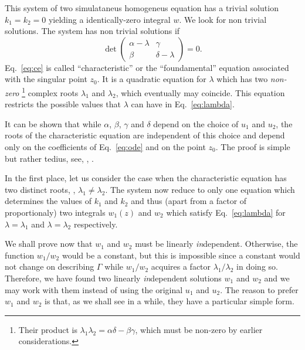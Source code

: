 This system of two simulataneus homogeneus equation has a trivial solution
$k_{1}= k_{2} = 0$ yielding a identically-zero integral $w$.
We look for non trivial solutions.
The system has non trivial solutions if 
\begin{dmath}[label={ce}]
   \det \begin{pmatrix} \alpha - \lambda & \gamma \\ \beta & \delta - \lambda
   \end{pmatrix} = 0 .
\end{dmath}
Eq.~\eqref{eq:ce} is called ``characteristic'' or the ``foundamental''
equation associated with the singular point $z_{0}$.
It is a quadratic equation for $\lambda$ which has two \emph{non-zero}%
\footnote{Their product is $\lambda_{1} \lambda_{2} = \alpha \delta - \beta
   \gamma$, which must be non-zero by earlier considerations.}
complex roots
$\lambda_{1}$ and $\lambda_{2}$, which eventually may coincide.
This equation restricts the possible values that $\lambda$ can have in
Eq.~\eqref{eq:lambda}.

It can be shown that while $\alpha$, $\beta$, $\gamma$ and $\delta$ depend on
the choice of $u_{1}$ and $u_{2}$, the roots of the characteristic equation are
independent of this choice and depend only on the coefficients of
Eq.~\eqref{eq:ode} and on the point $z_{0}$.  The proof is simple but rather
tedius, see, \eg, \textcite[\S~15.20]{Ince:1956}.  

In the first place, 
 let us consider the case when the characteristic
equation has two distinct roots, \ie, $\lambda_{1} \neq
\lambda_{2}$.
The system now reduce to only one equation which determines 
the values of $k_{1}$ and $k_{2}$ and thus (apart from a
factor of proportionaly) two integrals $w_{1}(z)$ and $w_{2}$ which
satisfy Eq.~\eqref{eq:lambda} for $\lambda=\lambda_{1}$ and
$\lambda=\lambda_{2}$ respectively.

We shall prove now that $w_{1}$ and $w_{2}$ must be linearly \emph{in}dependent.
Otherwise, the function $w_{1} / w_{2}$ would be a constant, but this is
impossible since a constant would  not change on describing $\Gamma$ while
$w_{1}/w_{2}$ acquires a factor $\lambda_{1} / \lambda_{2}$ in doing so.
Therefore, we have found two linearly \emph{in}dependent  solutions $w_{1}$ and
$w_{2}$ and we may work with them instead of using the original $u_{1}$ and
$u_{2}$. The reason to prefer $w_{1}$ and $w_{2}$ is that, as we shall see in a
while, they have a particular simple form.

